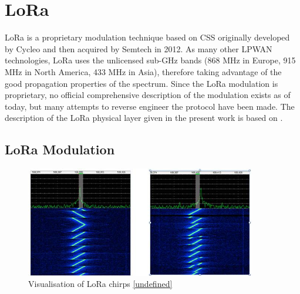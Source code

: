 
\section{LoRa}

LoRa is a proprietary modulation technique based on \gls{CSS} originally developed by Cycleo and then acquired by Semtech in 2012. As many other \gls{LPWAN} technologies, LoRa uses the unlicensed sub-GHz bands (868 MHz in Europe, 915 MHz in North America, 433 MHz in Asia), therefore taking advantage of the good propagation properties of the spectrum. Since the LoRa modulation is proprietary, no official comprehensive description of the modulation exists as of today, but many attempts to reverse engineer the protocol have been made. The description of the LoRa physical layer given in the present work is based on \cite{undefined}.

\subsection{LoRa Modulation}

\begin{figure}[h]
    \centering
    \includegraphics[width=0.9\textwidth]{images/lora-chirps.jpg}
    \caption{Visualisation of LoRa chirps \ref{undefined}}
    \label{fig:lora-chirps}
\end{figure}

